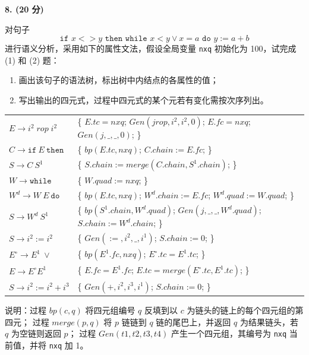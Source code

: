 \documentclass[UTF8,zihao=-4]{ctexart}
\newcommand{\score}[1]{\textbf{(#1 分)}}
\newcommand{\gto}{\rightarrow}
\newcommand{\qtitle}[3]{\vspace{0.6em}\textbf{#1. \score{#2} #3}\par}
\newcommand{\kw}[1]{\texttt{#1}}
\begin{document}
\qtitle{8}{20}{}
对句子
\[
  \kw{if }x<>y\kw{ then while }x<y\lor x=a\kw{ do }y:=a+b
\]
进行语义分析，采用如下的属性文法，假设全局变量 \kw{nxq} 初始化为 100，试完成 (1) 和 (2) 题：
\begin{enumerate}[label=(\arabic*)]
  \item 画出该句子的语法树，标出树中内结点的各属性的值；
  \item 写出输出的四元式，过程中四元式的某个元若有变化需按次序列出。
\end{enumerate}

\small
\begin{tabularx}{\textwidth}{@{}>{\raggedright\arraybackslash}p{}X@{}}
$E\gto i^2\;rop\;i^2$ &
\{ $E.tc=nxq$; $Gen(jrop,i^2,i^2,0)$; $E.fc=nxq$; $Gen(j,\_,\_,0)$; \}\\

$C\gto \kw{if}\ E\ \kw{then}$ &
\{ $bp(E.tc,nxq)$; \quad $C.chain:=E.fc$; \}\\

$S\gto C\ S^1$ &
\{ $S.chain:=merge(C.chain,S^1.chain)$; \}\\

$W\gto \kw{while}$ &
\{ $W.quad:=nxq$; \}\\

$W^d\gto W\ E\ \kw{do}$ &
\{ $bp(E.tc,nxq)$; \quad $W^d.chain:=E.fc$; $W^d.quad:=W.quad$; \}\\

$S\gto W^d\ S^1$ &
\{ $bp(S^1.chain,W^d.quad)$; $Gen(j,\_,\_,W^d.quad)$; $S.chain:=W^d.chain$; \}\\

$S\gto i^2:=i^2$ &
\{ $Gen(:=,i^2,\_,i^1)$; $S.chain:=0$; \}\\

$E^\circ\gto E^1\ \lor$ &
\{ $bp(E^1.fc,nxq)$; $E^\circ.tc=E^1.tc$; \}\\

$E\gto E^\circ E^1$ &
\{ $E.fc=E^1.fc$; $E.tc=merge(E^\circ.tc,E^1.tc)$; \}\\

$S\gto i^2:=i^2+i^3$ &
\{ $Gen(+,i^2,i^3,i^1)$; $S.chain:=0$; \}\\
\end{tabularx}
\normalsize

\vspace{0.5em}
说明：过程 $bp(c,q)$ 将四元组编号 $q$ 反填到以 $c$ 为链头的链上的每个四元组的第四元；
过程 $merge(p,q)$ 将 $p$ 链链到 $q$ 链的尾巴上，并返回 $q$ 为结果链头，若 $q$ 为空链则返回 $p$；
过程 $Gen(t1,t2,t3,t4)$ 产生一个四元组，其编号为 \kw{nxq} 当前值，并将 \kw{nxq} 加 1。
\end{document}
